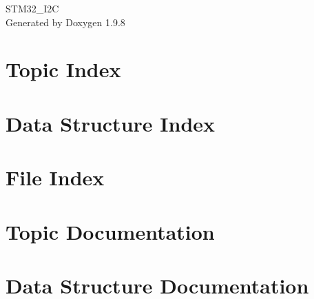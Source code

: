 \documentclass[twoside]{book}
\newcommand{\+}{\discretionary{\mbox{\scriptsize$\hookleftarrow$}}{}{}}
\newcommand{\clearemptydoublepage}{%
    \newpage{\pagestyle{empty}\cleardoublepage}%
  }
\begin{document}
  \raggedbottom
    \hypersetup{pageanchor=false,
                bookmarksnumbered=true,
                pdfencoding=unicode
               }
  \begin{titlepage}
  \vspace*{7cm}
  \begin{center}%
  {\Large STM32\+\_\+\+I2C}\\
  \vspace*{1cm}
  {\large Generated by Doxygen 1.9.8}\\
  \end{center}
  \end{titlepage}
  \clearemptydoublepage
  \tableofcontents
  \clearemptydoublepage
  \hypersetup{pageanchor=true}
\chapter{Topic Index}

\chapter{Data Structure Index}

\chapter{File Index}

\chapter{Topic Documentation}

\chapter{Data Structure Documentation}











\end{document}
